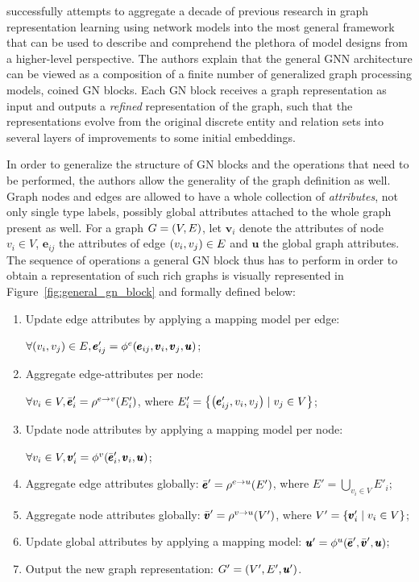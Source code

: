\cite{battaglia_relational_2018} successfully attempts to aggregate a decade of previous research in graph representation learning using network models into the most general framework that can be used to describe and comprehend the plethora of model designs from a higher-level perspective. The authors explain that the general GNN architecture can be viewed as a composition of a finite number of generalized graph processing models, coined GN blocks. Each GN block receives a graph representation as input and outputs a \emph{refined} representation of the graph, such that the representations evolve from the original discrete entity and relation sets into several layers of improvements to some initial embeddings. 

In order to generalize the structure of GN blocks and the operations that need to be performed, the authors allow the generality of the graph definition as well. Graph nodes and edges are allowed to have a whole collection of \emph{attributes}, not only single type labels, possibly global attributes attached to the whole graph present as well. For a graph $G=\mathopen{}\left(V, E\right)$, let $\pmb{v}_i$ denote the attributes of node $v_i \in V$, $\pmb{e}_{ij}$ the attributes of edge $\mathopen{}\left(v_i,v_j\right)\in E$ and $\pmb{u}$ the global graph attributes. The sequence of operations a general GN block thus has to perform in order to obtain a representation of such rich graphs is visually represented in Figure~\ref{fig:general_gn_block} and formally defined below:
\begin{enumerate}
\item Update edge attributes by applying a mapping model per edge: 

$\forall \mathopen{}\left(v_i, v_j\right) \in E, \pmb{e}'_{ij} = \phi^e\mathopen{}\left(\pmb{e}_{ij},\pmb{v}_i,\pmb{v}_j,\pmb{u}\right)$;
\item Aggregate edge-attributes per node: 

$\forall v_i \in V,\bar{\pmb{e}}'_i = \rho^{e \to v}\mathopen{}\left(E'_i\right)$, where $E'_i = \mathopen{}\left\{\mathopen{}\left(\pmb{e}'_{ij}, v_i, v_j\right) \mid v_j \in V\right\}$;
\item Update node attributes by applying a mapping model per node: 

$\forall v_i \in V, \pmb{v}'_i = \phi^v\mathopen{}\left(\bar{\pmb{e}}'_i, \pmb{v}_i, \pmb{u}\right)$;
\item Aggregate edge attributes globally: $\bar{\pmb{e}}'=\rho^{e \to u}\mathopen{}\left(E'\right)$, where $E' = \bigcup_{v_i \in V}{E'_i}$;
\item Aggregate node attributes globally: $\bar{\pmb{v}}'=\rho^{v \to u}\mathopen{}\left(V'\right)$, where $V' = \mathopen{}\left\{\pmb{v}'_i \mid v_i \in V\right\}$;
\item Update global attributes by applying a mapping model: $\pmb{u}'=\phi^u\mathopen{}\left(\bar{\pmb{e}}', \bar{\pmb{v}}', \pmb{u}\right)$;
\item Output the new graph representation: $G'=\mathopen{}\left(V', E', \pmb{u}'\right)$.
\end{enumerate}

